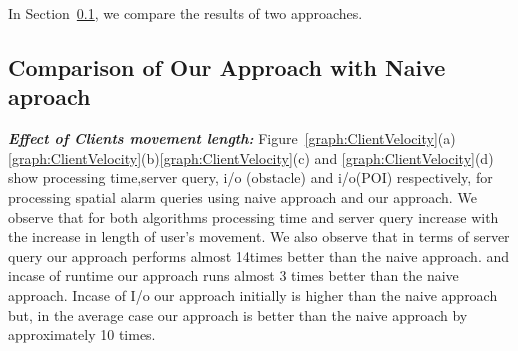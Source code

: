 In Section~\ref{subsec:naive}, we compare the results of two approaches.


\subsection{Comparison of Our Approach with Naive aproach}
\label{subsec:naive}
\textbf{\emph{Effect of Clients movement length: }}Figure~\ref{graph:ClientVelocity}(a) \ref{graph:ClientVelocity}(b)\ref{graph:ClientVelocity}(c) and \ref{graph:ClientVelocity}(d) show processing time,server query, i/o (obstacle) and i/o(POI) respectively, for processing spatial alarm queries using naive approach and our approach. We observe that for both algorithms processing time and server query increase with the increase in length of user's movement. We also observe that in terms of server query our approach performs almost 14times better than the naive approach. and incase of runtime our approach runs almost 3 times better than the naive approach. Incase of I/o our approach initially is higher than the naive approach but, in the average case our approach is better than the naive approach by approximately 10 times.

\vspace*{10pt}

